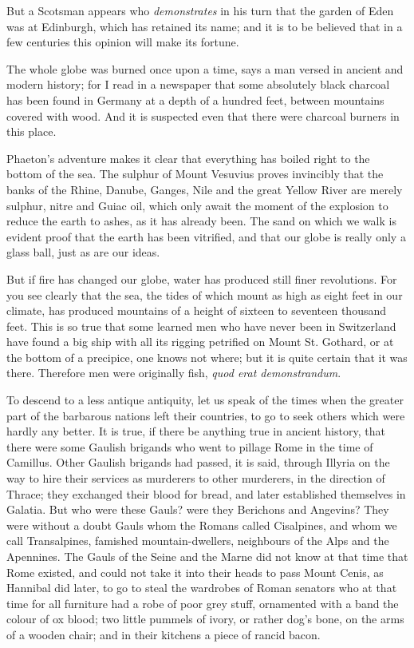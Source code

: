 But a Scotsman appears who \textit{demonstrates} in his turn that the garden of
Eden was at Edinburgh, which has retained its name; and it is to be
believed that in a few centuries this opinion will make its fortune.

The whole globe was burned once upon a time, says a man versed in
ancient and modern history; for I read in a newspaper that some
absolutely black charcoal has been found in Germany at a depth of a
hundred feet, between mountains covered with wood. And it is suspected
even that there were charcoal burners in this place.

Phaeton's adventure makes it clear that everything has boiled right to
the bottom of the sea. The sulphur of Mount Vesuvius proves invincibly
that the banks of the Rhine, Danube, Ganges, Nile and the great Yellow
River are merely sulphur, nitre and Guiac oil, which only await the
moment of the explosion to reduce the earth to ashes, as it has already
been. The sand on which we walk is evident proof that the earth has been
vitrified, and that our globe is really only a glass ball, just as are
our ideas.

But if fire has changed our globe, water has produced still finer
revolutions. For you see clearly that the sea, the tides of which mount
as high as eight feet in our climate, has produced mountains of a height
of sixteen to seventeen thousand feet. This is so true that some learned
men who have never been in Switzerland have found a big ship with all
its rigging petrified on Mount St. Gothard, or at the bottom of a
precipice, one knows not where; but it is quite certain that it was
there. Therefore men were originally fish, \textit{quod erat demonstrandum}.

To descend to a less antique antiquity, let us speak of the times when
the greater part of the barbarous nations left their countries, to go to
seek others which were hardly any better. It is true, if there be
anything true in ancient history, that there were some Gaulish brigands
who went to pillage Rome in the time of Camillus. Other Gaulish brigands
had passed, it is said, through Illyria on the way to hire their
services as murderers to other murderers, in the direction of Thrace;
they exchanged their blood for bread, and later established themselves
in Galatia. But who were these Gauls? were they Berichons and Angevins?
They were without a doubt Gauls whom the Romans called Cisalpines, and
whom we call Transalpines, famished mountain-dwellers, neighbours of the
Alps and the Apennines. The Gauls of the Seine and the Marne did not
know at that time that Rome existed, and could not take it into their
heads to pass Mount Cenis, as Hannibal did later, to go to steal the
wardrobes of Roman senators who at that time for all furniture had a
robe of poor grey stuff, ornamented with a band the colour of ox blood;
two little pummels of ivory, or rather dog's bone, on the arms of a
wooden chair; and in their kitchens a piece of rancid bacon.

